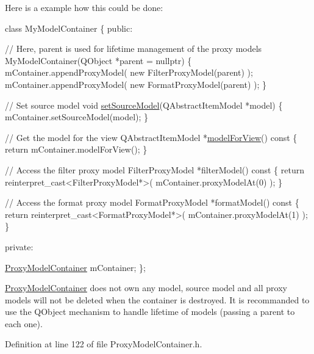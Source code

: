 Here is a example how this could be done\+: 
\begin{DoxyCode}
\textcolor{keyword}{class }MyModelContainer
\{
 \textcolor{keyword}{public}:

  \textcolor{comment}{// Here, parent is used for lifetime management of the proxy models}
  MyModelContainer(QObject *parent = \textcolor{keyword}{nullptr})
  \{
    mContainer.appendProxyModel( \textcolor{keyword}{new} FilterProxyModel(parent) );
    mContainer.appendProxyModel( \textcolor{keyword}{new} FormatProxyModel(parent) );
  \}

  \textcolor{comment}{// Set source model}
  \textcolor{keywordtype}{void} \hyperlink{class_mdt_1_1_item_model_1_1_proxy_model_container_a74f1afaa5c2002a6c0f7d31caed4fb2e}{setSourceModel}(QAbstractItemModel *model)
  \{
    mContainer.setSourceModel(model);
  \}

  \textcolor{comment}{// Get the model for the view}
  QAbstractItemModel *\hyperlink{class_mdt_1_1_item_model_1_1_proxy_model_container_ad7f8e95b0603b354a80bf4514db5a6e1}{modelForView}()\textcolor{keyword}{ const}
\textcolor{keyword}{  }\{
    \textcolor{keywordflow}{return} mContainer.modelForView();
  \}

  \textcolor{comment}{// Access the filter proxy model}
  FilterProxyModel *filterModel()\textcolor{keyword}{ const}
\textcolor{keyword}{  }\{
    \textcolor{keywordflow}{return} \textcolor{keyword}{reinterpret\_cast<}FilterProxyModel*\textcolor{keyword}{>}( mContainer.proxyModelAt(0) );
  \}

  \textcolor{comment}{// Access the format proxy model}
  FormatProxyModel *formatModel()\textcolor{keyword}{ const}
\textcolor{keyword}{  }\{
    \textcolor{keywordflow}{return} \textcolor{keyword}{reinterpret\_cast<}FormatProxyModel*\textcolor{keyword}{>}( mContainer.proxyModelAt(1) );
  \}

 \textcolor{keyword}{private}:

  \hyperlink{class_mdt_1_1_item_model_1_1_proxy_model_container_acef8f95b42382752a454b607bcf6d9b0}{ProxyModelContainer} mContainer;
\};
\end{DoxyCode}


\hyperlink{class_mdt_1_1_item_model_1_1_proxy_model_container}{Proxy\+Model\+Container} does not own any model, source model and all proxy models will not be deleted when the container is destroyed. It is recommanded to use the Q\+Object mechanism to handle lifetime of models (passing a parent to each one). 

Definition at line 122 of file Proxy\+Model\+Container.\+h.



